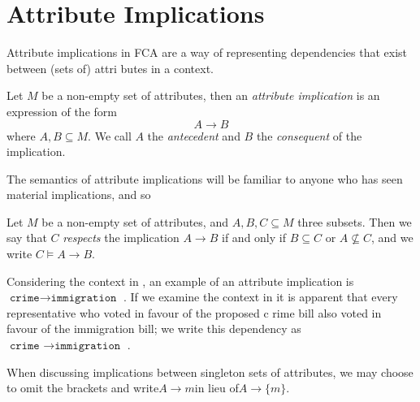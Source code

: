 \section{Attribute Implications}
\label{section:attribute-implications}Attribute implications in FCA are a way of representing dependencies that exist between
(sets of) attri butes in a context.
\begin{definition}
	\label{definition:attribute-implication} Let $M$ be a non-empty set of attributes, then an \emph{attribute implication}
	is an expression of the form
	\[
		A \rightarrow B
	\]
	where $A,B \subseteq M$. We call $A$ the \emph{antecedent} and $B$ the \emph{consequent} of the implication.
\end{definition}
The semantics of attribute implications will be familiar to anyone who has seen material implications, and so
\begin{definition}
	\label{definition:attribute-implication-semantics} Let $M$ be a non-empty set of attributes, and $A,B,C \subseteq M$
	three subsets. Then we say that $C$ \emph{respects} the implication $A \rightarrow B$ if and only if $B \subseteq C$
	or $A \not \subseteq C$, and we write $C \vDash A \rightarrow B$.
\end{definition}
Considering the context in , an example of an attribute implication is$\texttt{crime}\rightarrow
\texttt{immigration }$. If we examine the context in it is apparent that every representative
who voted in favour of the proposed c rime bill also voted in favour of the immigration bill; we write this dependency
as$\texttt{crime }\rightarrow \texttt{immigration }$.

When discussing implications between singleton sets of attributes, we may choose to omit the brackets and write$A \rightarrow
m$in lieu of$A \rightarrow \{m\}$.



